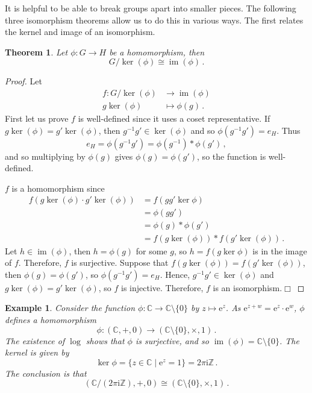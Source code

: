 \documentclass{article}
\theoremstyle{plain}\theoremheaderfont{\normalfont\itshape}\theorembodyfont{\rmfamily}\theoremseparator{.}\newtheorem*{rem}{Remark}\newtheorem*{ex}{Example}\newtheorem*{proof}{Proof}\newtheorem*{altp}{Alternative proof}\newtheorem*{nonex}{Non-Example}
\theoremstyle{plain}\theoremheaderfont{\normalfont\bfseries}\theorembodyfont{\rmfamily}\theoremseparator{.}\newtheorem{thm}{Theorem}[section]\newtheorem{lem}[thm]{Lemma}\newtheorem{prop}[thm]{Proposition}\newtheorem*{cor}{Corollary}\newtheorem{defn}[thm]{Definition}\newtheorem{clm}[thm]{Claim}\newtheorem{clminproof}{Claim}\newtheorem*{notn}{Notation}\newtheorem*{exer}{Exercise}\newtheorem*{lemnn}{Lemma}
\theoremstyle{break}\theoremheaderfont{\normalfont\itshape}\theorembodyfont{\rmfamily}\theoremseparator{.\medskip}\newtheorem*{proofskip}{Proof}\newtheorem*{exs}{Examples}\newtheorem*{rems}{Remarks}\newtheorem*{obs}{Observations}
\theoremstyle{break}\theoremheaderfont{\normalfont\bfseries}\theorembodyfont{\rmfamily}\theoremseparator{.\medskip}\newtheorem{lemskip}[thm]{Lemma}\newtheorem{defnskip}[thm]{Definition}\newtheorem{propskip}[thm]{Proposition}\newtheorem{thmskip}[thm]{Theorem}
\numberwithin{equation}{section}
\newcommand{\qed}{\hfill\ensuremath{\Box}}
\newcommand{\ii}{\mathrm{i}}
\newcommand{\ee}{\mathrm{e}}
\DeclareMathOperator*{\im}{im}
\newcommand{\ZZ}{\mathbb{Z}}
\newcommand{\CC}{\mathbb{C}}
\begin{document}
    It is helpful to be able to break groups apart into smaller pieces. The following three isomorphism theorems allow us to do this in various ways. The first relates the kernel and image of an isomorphism.
    \begin{thm}
        Let \(\phi:G\to H\) be a homomorphism, then
        \[G/\ker(\phi)\cong\im(\phi)\,.\]
    \end{thm}
    \begin{proof}
        Let
        \begin{align*}
            f:G/\ker(\phi)&\longrightarrow\im(\phi)\\
            g\ker(\phi)&\longmapsto\phi(g)\,.
        \end{align*}
        First let us prove \(f\) is well-defined since it uses a coset representative. If \(g\ker(\phi)=g'\ker(\phi)\), then \(g^{-1}g'\in\ker(\phi)\) and so \(\phi(g^{-1}g')=e_H\). Thus
        \[e_{H}=\phi(g^{-1}g')=\phi(g^{-1})*\phi(g')\,,\]
        and so multiplying by \(\phi(g)\) gives \(\phi(g)=\phi(g')\), so the function is well-defined.

        \(f\) is a homomorphism since
        \begin{align*}
            f(g\ker(\phi)\cdot g'\ker(\phi))&=f(gg'\ker\phi)\\
            &=\phi(gg')\\
            &=\phi(g)*\phi(g')\\
            &=f(g\ker(\phi))*f(g'\ker(\phi))\,.
        \end{align*}
        Let \(h\in\im(\phi)\), then \(h=\phi(g)\) for some \(g\), so \(h=f(g\ker\phi)\) is in the image of \(f\). Therefore, \(f\) is surjective. Suppose that \(f(g\ker(\phi))=f(g'\ker(\phi))\), then \(\phi(g)=\phi(g')\), so \(\phi(g^{-1}g')=e_H\). Hence, \(g^{-1}g'\in\ker(\phi)\) and \(g\ker(\phi)=g'\ker(\phi)\), so \(f\) is injective. Therefore, \(f\) is an isomorphism.\qed
    \end{proof}
    \begin{ex}
        Consider the function \(\phi:\CC\to\CC\setminus\{0\}\) by \(z\mapsto \ee^z\). As \(\ee^{z+w}=\ee^z\cdot \ee^w\), \(\phi\) defines a homomorphism
        \[\phi:(\CC,+,0)\to (\CC\setminus\{0\},\times,1)\,.\]
        The existence of \(\log\) shows that \(\phi\) is surjective, and so \(\im(\phi)=\CC\setminus\{0\}\). The kernel is given by
        \[\ker\phi=\{z\in\CC\mid \ee^z=1\}=2\pi \ii\ZZ\,.\]
        The conclusion is that
        \[(\CC/(2\pi \ii\ZZ),+,0)\cong(\CC\setminus\{0\},\times,1)\,.\]
    \end{ex}
\end{document}
